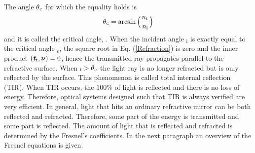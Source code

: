  The angle $\mbox{$\theta$}_{\textrm{c}}$ for which the equality holds is
\begin{equation}\label{critical}
\mbox{$\theta$}_{\textrm{c}} = \arcsin\Big(\frac{n_\textrm{t}}{n_\textrm{i}}\Big)
\end{equation} and it is called the critical angle, \cite{chaves2015introduction}.
When the incident angle \myangle$_{\textrm{i}}$ is exactly equal to the critical angle \myangle$_{\textrm{c}}$, the square root in Eq. (\ref{Refraction}) is zero and the inner product $(\textit{\textbf{t}}_\textrm{t},\boldsymbol{\nu})=0$, hence the transmitted ray propagates parallel to the refractive surface. 
When \myangle$_{\textrm{i}}>\mbox{$\theta$}_{\textrm{c}}$ the light ray is no longer refracted but is only reflected by the surface. This phenomenon is called total internal reflection (TIR). When TIR occurs, the $100\%$ of light is reflected and there is no loss of energy. Therefore, optical systems designed such that TIR is always verified are very efficient. In general, light that hits an ordinary refractive mirror can be both reflected and refracted. Therefore, some part of the energy is transmitted and some part is reflected. The amount of light that is reflected and refracted is determined by the Fresnel's coefficients.
In the next paragraph an overview of the Fresnel equations is given.

